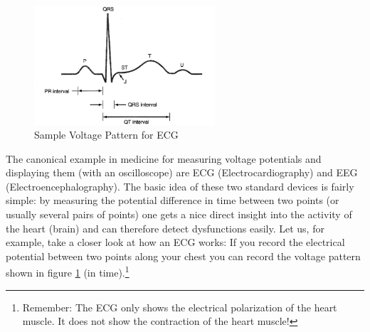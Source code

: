 \begin{figure}[h]
    \begin{center}
        \includegraphics[width=0.6\textwidth]{./Exp1/pic/image5.png}
    \end{center}
    \caption{Sample Voltage Pattern for ECG}
    \label{fig:ecgpattern}
\end{figure}

The canonical example in medicine for measuring voltage potentials and displaying them (with an oscilloscope) are ECG (Electrocardiography) and EEG (Electroencephalography). The basic idea of these two standard devices is fairly simple: by measuring the potential difference in time between two points (or usually several pairs of points) one gets a nice direct insight into the activity of the heart (brain) and can therefore detect dysfunctions easily. Let us, for example, take a closer look at how an ECG works: If you record the electrical potential between two points along your chest you can record the voltage pattern shown in figure \ref{fig:ecgpattern} (in time).\footnote{Remember: The ECG only shows the electrical polarization of the heart muscle. It does not show the contraction of the heart muscle!} \myskip

